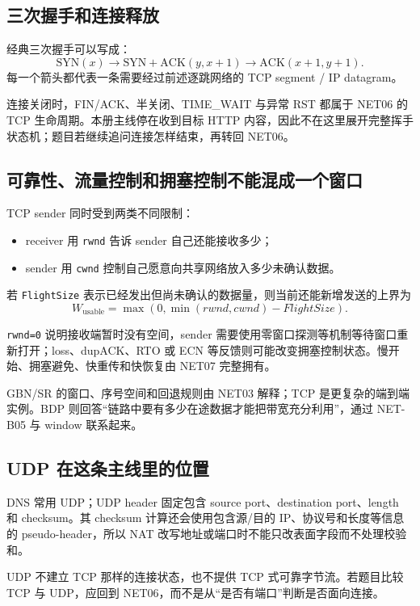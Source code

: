 \documentclass[UTF8,fontset=none,11pt,a4paper]{ctexart}
\begin{document}
\subsection{三次握手和连接释放}

经典三次握手可以写成：
\[
\mathrm{SYN}(x)
\to
\mathrm{SYN+ACK}(y,x+1)
\to
\mathrm{ACK}(x+1,y+1).
\]
每一个箭头都代表一条需要经过前述逐跳网络的 TCP segment / IP datagram。

连接关闭时，FIN/ACK、半关闭、TIME\_WAIT 与异常 RST 都属于 NET06 的 TCP 生命周期。本册主线停在收到目标 HTTP 内容，因此不在这里展开完整挥手状态机；题目若继续追问连接怎样结束，再转回 NET06。

\subsection{可靠性、流量控制和拥塞控制不能混成一个窗口}

TCP sender 同时受到两类不同限制：

\begin{itemize}
  \item receiver 用 \texttt{rwnd} 告诉 sender 自己还能接收多少；
  \item sender 用 \texttt{cwnd} 控制自己愿意向共享网络放入多少未确认数据。
\end{itemize}

若 \texttt{FlightSize} 表示已经发出但尚未确认的数据量，则当前还能新增发送的上界为
\[
W_{\mathrm{usable}}
=
\max\!\left(0,\min(rwnd,cwnd)-FlightSize\right).
\]

\texttt{rwnd=0} 说明接收端暂时没有空间，sender 需要使用零窗口探测等机制等待窗口重新打开；loss、dupACK、RTO 或 ECN 等反馈则可能改变拥塞控制状态。慢开始、拥塞避免、快重传和快恢复由 NET07 完整拥有。

GBN/SR 的窗口、序号空间和回退规则由 NET03 解释；TCP 是更复杂的端到端实例。BDP 则回答“链路中要有多少在途数据才能把带宽充分利用”，通过 NET-B05 与 window 联系起来。

\subsection{UDP 在这条主线里的位置}

DNS 常用 UDP；UDP header 固定包含 source port、destination port、length 和 checksum。其 checksum 计算还会使用包含源/目的 IP、协议号和长度等信息的 pseudo-header，所以 NAT 改写地址或端口时不能只改表面字段而不处理校验和。

UDP 不建立 TCP 那样的连接状态，也不提供 TCP 式可靠字节流。若题目比较 TCP 与 UDP，应回到 NET06，而不是从“是否有端口”判断是否面向连接。
\end{document}
